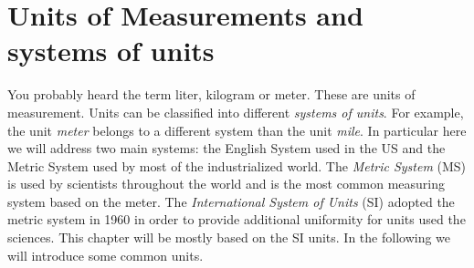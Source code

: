 \documentclass[main.tex]{subfiles}
\begin{document}
\section{Units of Measurements and systems of units}

You probably heard the term liter, kilogram or meter. These are units of measurement. Units can be classified into different \emph{systems of units}. For example, the unit \emph{meter} belongs to a different system than the unit \emph{mile}. In particular here we will address two main systems: the English System used in the US and the Metric System used by most of the industrialized world.
The \emph{Metric System} (MS) is used by  scientists throughout the world and is the most common measuring system based on the meter. The \emph{International System of Units} (SI) adopted the metric system in 1960 in order to provide additional uniformity for units used the sciences. This chapter will be mostly based on the SI units. In the following we will introduce some common units.
\end{document}
